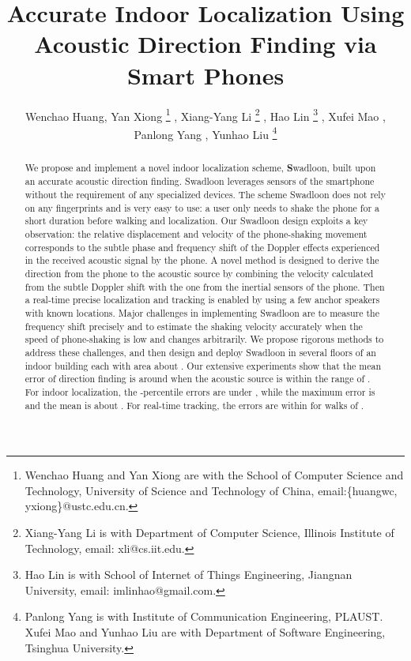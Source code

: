 \documentclass[]{sig-alternate-10pt}
\def \ourprotocol{Swadloon\xspace}
\begin{document}
\title{Accurate Indoor Localization Using Acoustic Direction Finding via Smart Phones}
\author{ Wenchao Huang, Yan Xiong 
\thanks{
    Wenchao Huang and Yan Xiong are with the School of Computer Science and Technology, University of Science and Technology of China, email:\{huangwc, yxiong\}@ustc.edu.cn. 
}
, Xiang-Yang Li
\thanks{
    Xiang-Yang Li is with Department of Computer Science, Illinois Institute of Technology, email: xli@cs.iit.edu.
}
, Hao Lin
\thanks{
    Hao Lin is with School of Internet of Things Engineering, Jiangnan University, email: imlinhao@gmail.com.
}
, Xufei Mao
, Panlong Yang
, Yunhao Liu
\thanks{
    Panlong Yang is with Institute of Communication Engineering, PLAUST.
    Xufei Mao and Yunhao Liu are with Department of Software Engineering, Tsinghua University.
}
}
\maketitle


\begin{abstract}
We propose and implement a novel indoor localization scheme,
 \textbf \ourprotocol, built upon an accurate acoustic direction finding.
 \ourprotocol leverages sensors of the smartphone
 without the requirement of any specialized devices.
The scheme \ourprotocol does not rely on any fingerprints and is very
 easy to use: a user only needs to shake the phone for a short
 duration before walking and localization.
Our  \ourprotocol design exploits  a key observation:
 the relative displacement and velocity of the phone-shaking
 movement corresponds to the subtle phase and frequency shift of the
 Doppler  effects experienced in the received acoustic signal by the
 phone.
A novel method is designed to derive the direction from the phone to
 the acoustic source  by combining the velocity calculated from the
 subtle Doppler shift with the one  from the inertial sensors of the
 phone.
Then a real-time precise localization and tracking is enabled by
 using a few anchor speakers with known locations.
Major challenges in implementing \ourprotocol are to measure the
 frequency shift precisely and to estimate the shaking velocity
 accurately when the speed of phone-shaking is low and changes
 arbitrarily.
We propose rigorous methods to address these challenges, and
 then design and deploy \ourprotocol in several  floors of an indoor
 building each with area  about .
Our extensive experiments show that the  mean
 error of direction finding is around  when the
 acoustic source is within the range of .
For indoor localization, the -percentile errors are under ,
 while the maximum error is  and the mean is about .
For real-time tracking, the errors are  within  for
 walks of  .
\end{abstract}
\end{document}
